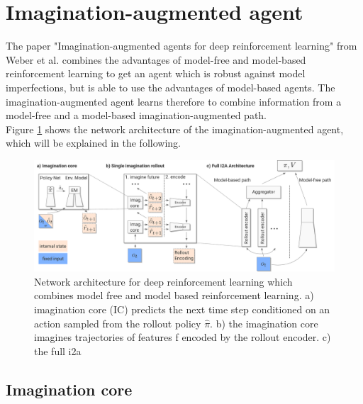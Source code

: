\section{Imagination-augmented agent} 
\label{sec:i2a} 
 
The paper "Imagination-augmented agents for deep reinforcement learning" from Weber et al. \cite{I2A} combines the advantages of model-free and model-based reinforcement learning to get an agent which is robust against model imperfections, but is able to use the advantages of model-based agents.
The imagination-augmented agent learns therefore to combine information from a model-free and a model-based imagination-augmented path.\\

 
Figure \ref{fig:i2a_architecture} shows the network architecture of the imagination-augmented agent, which will be explained in the following.

\begin{figure}[H] 
  \centering 
   
  \includegraphics[width=\columnwidth]{./Images/i2a_architecture.pdf} 
  \caption{Network architecture for deep reinforcement learning which combines model free and model based reinforcement learning. a) imagination core (IC) predicts the next time step conditioned on an action sampled from the rollout policy $\hat{\pi}$. b) the imagination core imagines trajectories of features f encoded by the rollout encoder. c) the full i2a} 
  \label{fig:i2a_architecture} 
\end{figure}

 
\subsection{Imagination core}

